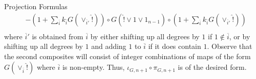 \begin{rmk}{Projection Formulas}
\begin{align*}
        &-\left(1 + \sum_{\overline{i}} k_{\overline{i}}G(\lor_{\overline{i}'}\hat{!})\right) \circ G(\hat{!}\lor 1\lor 1_{n-1})\circ \left(1 + \sum_{\overline{i}} k_{\overline{i}}G(\lor_{\overline{i}'}\hat{!})\right)  \\
    \end{align*}
    where $\overline{i}'$ is obtained from $\overline{i}$ by either shifting up all degrees by $1$ if $1 \notin \overline{i}$, or by shifting up all degrees by $1$ and adding $1$ to $\overline{i}$ if it does contain $1$. Observe that the second composites will consist of integer combinations of maps of the form $G(\lor_{\overline{i}}\hat{!})$ where $\overline{i}$ is non-empty. Thus, $\iota_{G,n+1}\circ \pi_{G,n+1}$ is of the desired form.

\end{rmk}
